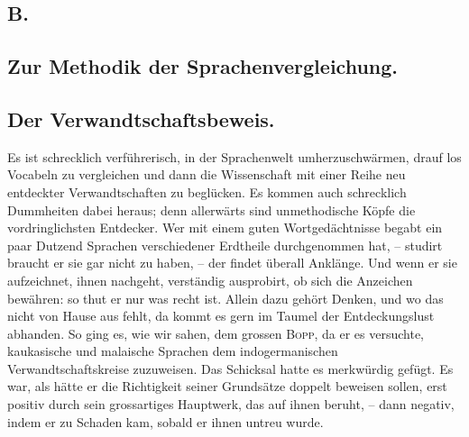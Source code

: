 \subsection*{B.}\label{III.I.I.2B}
\subsection*{Zur Methodik der Sprachenvergleichung.}
\subsection*{Der Verwandtschaftsbeweis.}
Es ist schrecklich verführerisch, in der Sprachenwelt umherzuschwärmen, drauf los Vocabeln zu vergleichen und dann die Wissenschaft mit einer Reihe neu entdeckter Verwandtschaften zu beglücken. Es kom\label{fp.165}men auch schrecklich  Dummheiten dabei heraus; denn allerwärts sind unmethodische Köpfe die vordringlichsten Entdecker. Wer mit einem guten Wortgedächtnisse begabt ein paar Dutzend Sprachen verschiedener Erdtheile durchgenommen hat, – studirt \label{sp.155} braucht er sie gar nicht zu haben, – der findet überall Anklänge. Und wenn er sie aufzeichnet, ihnen nachgeht, verständig ausprobirt, ob sich die Anzeichen bewähren: so thut er nur was recht ist. Allein dazu gehört  Denken, und wo das nicht von Hause aus fehlt, da kommt es gern im Taumel der Entdeckungslust abhanden. So ging es, wie wir sahen, dem grossen \textsc{Bopp}, da er es versuchte, kaukasische und malaische Sprachen dem indogermanischen Verwandtschaftskreise zuzuweisen. Das Schicksal hatte es merkwürdig gefügt. Es war, als hätte er die Richtigkeit seiner Grundsätze doppelt beweisen sollen, erst positiv durch sein grossartiges Hauptwerk, das auf ihnen beruht, – dann negativ, indem er zu Schaden kam, sobald er ihnen untreu wurde.

